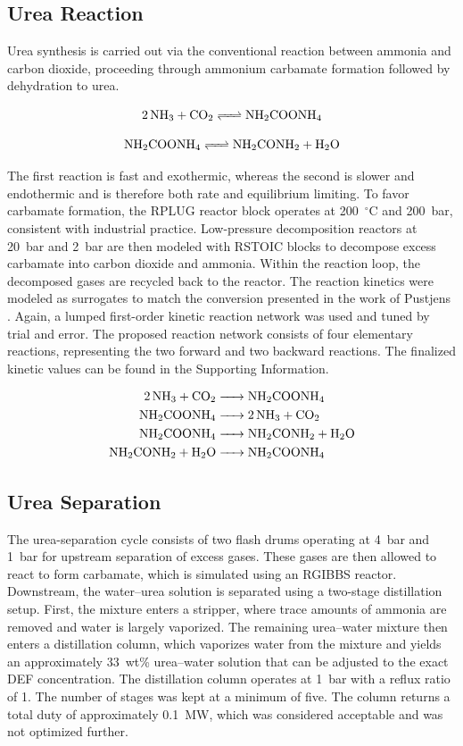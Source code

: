 \documentclass[letterpaper]{article}
\begin{document}
\subsection{Urea Reaction}
Urea synthesis is carried out via the conventional reaction between
ammonia and carbon dioxide, proceeding through ammonium carbamate
formation followed by dehydration to urea.

\begin{equation}
\ce{2NH3 + CO2 <=> NH2COONH4}
\end{equation}

\begin{equation}
\ce{NH2COONH4 <=> NH2CONH2 + H2O}
\end{equation}

\noindent The first reaction is fast and exothermic, whereas the
second is slower and endothermic and is therefore both rate and
equilibrium limiting. To favor carbamate formation, the RPLUG reactor
block operates at 200~$^\circ$C and 200~bar, consistent with
industrial practice. Low-pressure decomposition reactors at 20~bar
and 2~bar are then modeled with RSTOIC blocks to decompose excess
carbamate into carbon dioxide and ammonia. Within the reaction loop,
the decomposed gases are recycled back to the reactor. The reaction
kinetics were modeled as surrogates to match the conversion presented
in the work of Pustjens \cite{Pustjens2018}. Again, a lumped
first-order kinetic reaction network was used and tuned by trial and
error. The proposed reaction network consists of four elementary
reactions, representing the two forward and two backward
reactions. The finalized kinetic values can be found in the
Supporting Information.

\begin{align}
\ce{2NH3 + CO2 &-> NH2COONH4} \\
\ce{NH2COONH4 &-> 2NH3 + CO2} \\
\ce{NH2COONH4 &-> NH2CONH2 + H2O} \\
\ce{NH2CONH2 + H2O &-> NH2COONH4}
\end{align}

\subsection{Urea Separation}
The urea-separation cycle consists of two flash drums operating at
4~bar and 1~bar for upstream separation of excess gases. These gases
are then allowed to react to form carbamate, which is simulated using
an RGIBBS reactor. Downstream, the water--urea solution is separated
using a two-stage distillation setup. First, the mixture enters a
stripper, where trace amounts of ammonia are removed and water is
largely vaporized. The remaining urea--water mixture then enters a
distillation column, which vaporizes water from the mixture and
yields an approximately 33~wt\% urea--water solution that can be
adjusted to the exact DEF concentration. The distillation column
operates at 1~bar with a reflux ratio of 1. The number of stages was
kept at a minimum of five. The column returns a total duty of
approximately 0.1~MW, which was considered acceptable and was not
optimized further.
\end{document}
